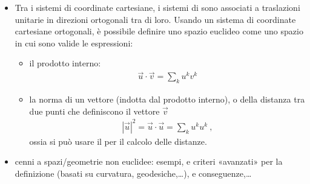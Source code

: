\documentclass[letterpaper,10pt,italian]{jupyterBook}
\begin{document}
\begin{itemize}
\item {} 
\sphinxAtStartPar
Tra i sistemi di coordinate cartesiane, i sistemi di  sono associati a traslazioni unitarie in direzioni ortogonali tra di loro. Usando un sistema di coordinate cartesiane ortogonali, è possibile definire uno spazio euclideo come uno spazio in cui sono valide le espressioni:
\begin{itemize}
\item {} 
\sphinxAtStartPar
il prodotto interno:
\begin{equation*}
\begin{split}\vec{u} \cdot \vec{v} = \sum_k u^k v^k\end{split}
\end{equation*}
\item {} 
\sphinxAtStartPar
la norma di un vettore (indotta dal prodotto interno), o della distanza tra due punti che definiscono il vettore \(\vec{v}\)
\begin{equation*}
\begin{split}|\vec{u}|^2 = \vec{u} \cdot \vec{u} = \sum_k u^k u^k \ ,\end{split}
\end{equation*}
\sphinxAtStartPar
ossia si può usare il  per il calcolo delle distanze.

\end{itemize}

\item {} 
\sphinxAtStartPar
{} cenni a spazi/geometrie non euclidee: esempi, e criteri «avanzati» per la definizione (basati su curvatura, geodesiche,…), e conseguenze,…

\end{itemize}

\sphinxstepscope
\end{document}
